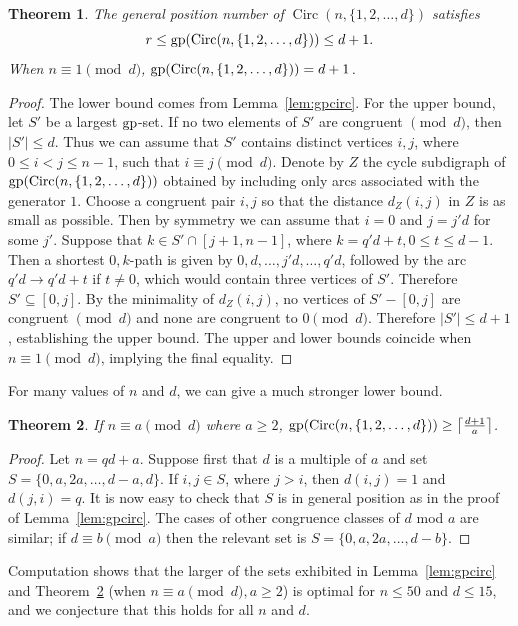 \documentclass[a4paper,12pt]{article}
\newtheorem{theorem}{Theorem}[section]
\theoremstyle{definition}
\newcommand{\gp}{{\rm gp}}
\DeclareMathOperator{\Circ}{Circ}
\begin{document}
	\begin{theorem}\label{thm:dircirc}
		The general position number of $\Circ(n,\{1,2,\ldots,d\})$ satisfies
		\[r\leq \gp(\Circ(n,\{1,2,\ldots,d\}))\leq d+1.\] When $n\equiv 1\pmod{d}$, $\gp(\Circ(n,\{1,2,\ldots,d\})) = d+1$.
	\end{theorem}
	\begin{proof}
		The lower bound comes from Lemma~\ref{lem:gpcirc}. For the upper bound, let $S'$ be a largest $\gp $-set. If no two elements of $S'$ are congruent $\pmod{d}$, then $|S'| \leq d$. Thus we can assume that $S'$ contains distinct vertices $i,j$, where $0 \leq i < j \leq n-1$, such that $i \equiv j \pmod{d}$. Denote by $Z$ the cycle subdigraph of $\gp(\Circ(n,\{1,2,\ldots,d\}))$ obtained by including only arcs associated with the generator $1$. Choose a congruent pair $i,j$ so that the distance $d_Z(i,j)$ in $Z$ is as small as possible. Then by symmetry we can assume that $i = 0$ and $j = j'd$ for some $j'$. Suppose that $k \in S' \cap [j+1,n-1]$, where $k = q'd+t, 0 \leq t \leq d-1$. Then a shortest $0,k$-path is given by $0,d,\ldots ,j'd,\ldots ,q'd$, followed by the arc $q'd \rightarrow q'd+t$ if $t \neq 0$, which would contain three vertices of $S'$. Therefore $S' \subseteq [0,j]$. By the minimality of $d_Z(i,j)$, no vertices of $S'-[0,j]$ are congruent $\pmod{d}$ and none are congruent to $0 \pmod{d}$. Therefore $|S'| \leq d+1$, establishing the upper bound. The upper and lower bounds coincide when $n\equiv 1\pmod{d}$, implying the final equality.
	\end{proof}
	For many values of $n$ and $d$, we can give a much stronger lower bound.
	
	\begin{theorem}\label{thm:ncong2}
		If $n \equiv a \pmod{d}$ where $a\geq 2$, $\gp(\Circ(n,\{1,2,\ldots,d\})) \geq \left \lceil \frac{d+1}{a} \right \rceil $.
	\end{theorem}
	\begin{proof}
		Let $n = qd + a$. Suppose first that $d$ is a multiple of $a$ and set $S = \{ 0,a,2a,\ldots,d-a,d\} $. If $i,j \in S$, where $j > i$, then $d(i,j) = 1$ and $d(j,i) = q$. It is now easy to check that $S$ is in general position as in the proof of Lemma~\ref{lem:gpcirc}. The cases of other congruence classes of $d$ mod $a$ are similar; if $d\equiv b\pmod{a}$ then the relevant set is $S = \{ 0,a,2a,\ldots,d-b\}$.
	\end{proof}
	Computation shows that the larger of the sets exhibited in Lemma~\ref{lem:gpcirc} and Theorem~\ref{thm:ncong2} (when $n \equiv a \pmod{d}, a\geq 2$) is optimal for $n \leq 50$ and $d \leq 15$, and we conjecture that this holds for all $n$ and $d$.
	
\end{document}
